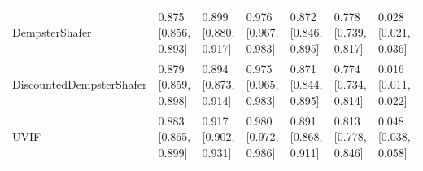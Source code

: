 \begin{table}[t]
{\begin{tabular}{lllllll}
DempsterShafer & 0.875 [0.856, 0.893] & 0.899 [0.880, 0.917] & 0.976 [0.967, 0.983] & 0.872 [0.846, 0.895] & 0.778 [0.739, 0.817] & 0.028 [0.021, 0.036] \\
DiscountedDempsterShafer & 0.879 [0.859, 0.898] & 0.894 [0.873, 0.914] & 0.975 [0.965, 0.983] & 0.871 [0.844, 0.895] & 0.774 [0.734, 0.814] & 0.016 [0.011, 0.022] \\
UVIF & 0.883 [0.865, 0.899] & 0.917 [0.902, 0.931] & 0.980 [0.972, 0.986] & 0.891 [0.868, 0.911] & 0.813 [0.778, 0.846] & 0.048 [0.038, 0.058] \\
\bottomrule
\end{tabular}
}
\end{table}

